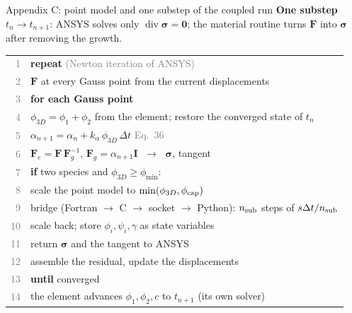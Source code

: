 \documentclass[aspectratio=169,11pt]{beamer}
\begin{document}
\begin{frame}{Appendix C: point model and one substep of the coupled run}
\textbf{One substep $t_n\to t_{n+1}$}: ANSYS solves only $\operatorname{div}\boldsymbol\sigma=\mathbf 0$;
the material routine turns $\mathbf F$ into $\boldsymbol\sigma$ after removing the growth.\\[2pt]
\scriptsize
\renewcommand{\arraystretch}{1.0}
\begin{tabular}{@{}r@{\hspace{6pt}}l@{}}
\textcolor{gray}{1} & \textbf{repeat} \textcolor{gray}{(Newton iteration of ANSYS)}\\
\textcolor{gray}{2} & \quad $\mathbf F$ at every Gauss point from the current displacements\\
\textcolor{gray}{3} & \quad \textbf{for each Gauss point}\\
\textcolor{gray}{4} & \quad\quad $\phi_{3D}=\phi_1+\phi_2$ from the element; restore the converged state of $t_n$\\
\textcolor{gray}{5} & \quad\quad $\alpha_{n+1}=\alpha_n+k_\alpha\,\phi_{3D}\,\Delta t$ \hfill\textcolor{gray}{Eq.\ 36}\\
\textcolor{gray}{6} & \quad\quad $\mathbf F_e=\mathbf F\,\mathbf F_g^{-1}$, $\mathbf F_g=\alpha_{n+1}\mathbf I$ $\;\to\;$ $\boldsymbol\sigma$, tangent\\
\textcolor{gray}{7} & \quad\quad \textbf{if} two species and $\phi_{3D}\ge\phi_{\min}$:\\
\textcolor{gray}{8} & \quad\quad\quad scale the point model to $\min(\phi_{3D},\phi_{\rm cap})$\\
\textcolor{gray}{9} & \quad\quad\quad bridge (Fortran $\to$ C $\to$ socket $\to$ Python): $n_{\rm sub}$ steps of $s\Delta t/n_{\rm sub}$\\
\textcolor{gray}{10} & \quad\quad\quad scale back; store $\phi_i,\psi_i,\gamma$ as state variables\\
\textcolor{gray}{11} & \quad\quad return $\boldsymbol\sigma$ and the tangent to ANSYS\\
\textcolor{gray}{12} & \quad assemble the residual, update the displacements\\
\textcolor{gray}{13} & \textbf{until} converged\\
\textcolor{gray}{14} & the element advances $\phi_1,\phi_2,c$ to $t_{n+1}$ (its own solver)\\
\end{tabular}
\end{frame}
\end{document}
